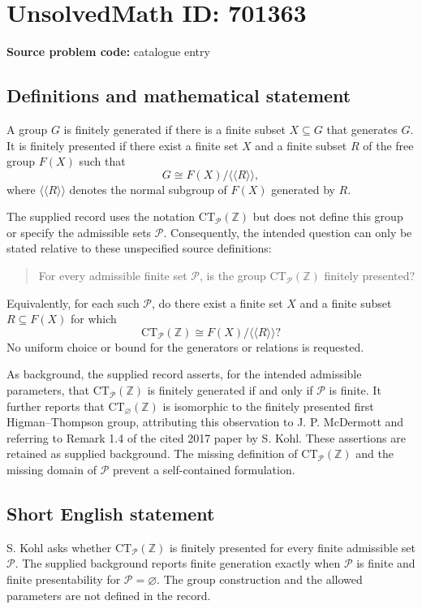 \documentclass[11pt]{article}
\newcommand{\Z}{\mathbb{Z}}
\begin{document}
\section*{UnsolvedMath ID: 701363}
\textbf{Source problem code:} catalogue entry
\subsection{Definitions and mathematical statement}
A group \(G\) is finitely generated if there is a finite subset \(X\subseteq G\) that generates \(G\). It is finitely presented if there exist a finite set \(X\) and a finite subset \(R\) of the free group \(F(X)\) such that
\[
G\cong F(X)/\langle\!\langle R\rangle\!\rangle,
\]
where \(\langle\!\langle R\rangle\!\rangle\) denotes the normal subgroup of \(F(X)\) generated by \(R\).

The supplied record uses the notation \(\mathrm{CT}_{\mathcal P}(\Z)\) but does not define this group or specify the admissible sets \(\mathcal P\). Consequently, the intended question can only be stated relative to these unspecified source definitions:
\begin{quote}
For every admissible finite set \(\mathcal P\), is the group \(\mathrm{CT}_{\mathcal P}(\Z)\) finitely presented?
\end{quote}
Equivalently, for each such \(\mathcal P\), do there exist a finite set \(X\) and a finite subset \(R\subseteq F(X)\) for which
\[
\mathrm{CT}_{\mathcal P}(\Z)\cong F(X)/\langle\!\langle R\rangle\!\rangle?
\]
No uniform choice or bound for the generators or relations is requested.

As background, the supplied record asserts, for the intended admissible parameters, that \(\mathrm{CT}_{\mathcal P}(\Z)\) is finitely generated if and only if \(\mathcal P\) is finite. It further reports that \(\mathrm{CT}_{\varnothing}(\Z)\) is isomorphic to the finitely presented first Higman--Thompson group, attributing this observation to J. P. McDermott and referring to Remark 1.4 of the cited 2017 paper by S. Kohl. These assertions are retained as supplied background. The missing definition of \(\mathrm{CT}_{\mathcal P}(\Z)\) and the missing domain of \(\mathcal P\) prevent a self-contained formulation.
\subsection{Short English statement}
S. Kohl asks whether \(\mathrm{CT}_{\mathcal P}(\Z)\) is finitely presented for every finite admissible set \(\mathcal P\). The supplied background reports finite generation exactly when \(\mathcal P\) is finite and finite presentability for \(\mathcal P=\varnothing\). The group construction and the allowed parameters are not defined in the record.
\end{document}
